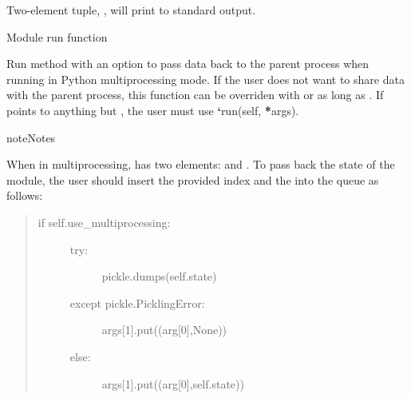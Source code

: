\documentclass[letterpaper,10pt,openany,oneside,english]{sphinxmanual}
\begin{document}
\begin{fulllineitems}
\begin{fulllineitems}
\begin{fulllineitems}
\label{\detokenize{examples_rst/droplet:droplet.Droplet.show_time}}
 \textendash{} Two-element tuple, ,  will print to standard
output.

\end{fulllineitems}


\end{fulllineitems}


\begin{fulllineitems}
\label{\detokenize{examples_rst/droplet:droplet.Droplet.run}}
Module run function

Run method with an option to pass data back to the parent process when running
in Python multiprocessing mode. If the user does not want to share data with
the parent process, this function can be overriden with 
or  as long as .
If  points to anything but , the user must use
{\color{red}\bfseries{}{}`}run(self, {\color{red}\bfseries{}*}args).

\begin{sphinxadmonition}{note}{Notes}

When in multiprocessing,  has two elements:  and .
To pass back the state of the module, the user should insert the provided
index  and the  into the queue as follows:
\begin{quote}
\begin{description}
\item[{if self.use\_multiprocessing:}] \leavevmode\begin{description}
\item[{try:}] \leavevmode
pickle.dumps(self.state)

\item[{except pickle.PicklingError:}] \leavevmode
args{[}1{]}.put((arg{[}0{]},None))

\item[{else:}] \leavevmode
args{[}1{]}.put((arg{[}0{]},self.state))

\end{description}


\end{description}
\end{quote}
\end{sphinxadmonition}
\end{fulllineitems}
\end{fulllineitems}
\end{document}
